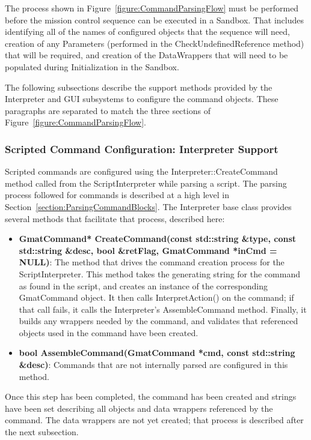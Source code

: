 The process shown in Figure~\ref{figure:CommandParsingFlow} must be performed before the mission
control sequence can be executed in a Sandbox.  That includes identifying all of the names of
configured objects that the sequence will need, creation of any Parameters (performed in the
CheckUndefinedReference method) that will be required, and creation of the DataWrappers that will
need to be populated during Initialization in the Sandbox.

The following subsections describe the support methods provided by the Interpreter and GUI
subsystems to configure the command objects.  These paragraphs are separated to match the three
sections of Figure~\ref{figure:CommandParsingFlow}.

\subsubsection{Scripted Command Configuration: Interpreter Support}

Scripted commands are configured using the Interpreter::CreateCommand method called from the
ScriptInterpreter while parsing a script.  The parsing process followed for commands is described
at a high level in Section~\ref{section:ParsingCommandBlocks}.  The Interpreter base class provides
several methods that facilitate that process, described here:

\begin{itemize}
\item \textbf{GmatCommand* CreateCommand(const std::string \&type, const std::string \&desc, bool
\&retFlag, GmatCommand *inCmd = NULL)}:  The method that drives the command creation process for the
ScriptInterpreter.  This method takes the generating string for the command as found in the script,
and creates an instance of the corresponding GmatCommand object.  It then calls InterpretAction() on
the command; if that call fails, it calls the Interpreter's AssembleCommand method.  Finally, it
builds any wrappers needed by the command, and validates that referenced objects used in the command
have been created.
\item \textbf{bool AssembleCommand(GmatCommand *cmd, const std::string \&desc)}:  Commands that are
not internally parsed are configured in this method.
\end{itemize}

Once this step has been completed, the command has been created and strings have been set describing
all objects and data wrappers referenced by the command.  The data wrappers are not yet created;
that process is described after the next subsection.

